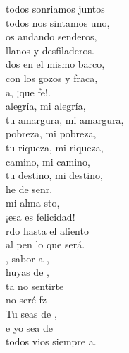 \documentclass[12pt]{article}
\begin{document}
\begin{multicols*}{2}
\begin{cancion}%
	 todos sonriamos juntos\\
todos nos sintamos uno,\\
	os andando senderos,\\
llanos y desfiladeros.\\
	dos en el mismo barco,\\
	con los gozos y fraca,\\
	a, ¡que fe!. \\
\jump
	alegría, mi alegría,\\
tu amargura, mi amargura,\\
	pobreza, mi pobreza,\\
tu riqueza, mi riqueza,\\
	 camino, mi camino,\\
	tu destino, mi destino,\\
	he de senr.\\
\jump
	mi alma sto,\\
	¡esa es felicidad!\\
	rdo hasta el aliento\\
	al pen lo que será.\\
	, sabor a ,\\
	 huyas de ,\\
	ta no sentirte\\
	no seré fz\\
	 Tu seas de ,\\
	e yo sea de \\
	 todos vios siempre a.\\
\end{cancion}%


\end{multicols*}
\end{document}
